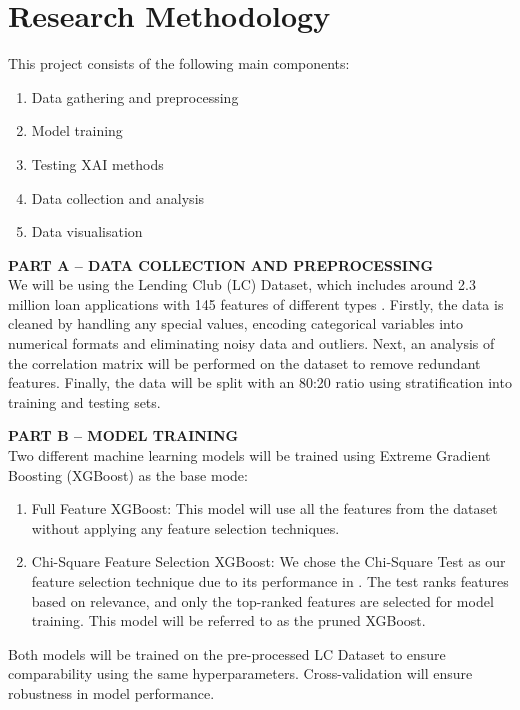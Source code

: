 \documentclass[12pt,a4paper]{article}
\begin{document}
\section{Research Methodology}
\vspace{-1em}
This project consists of the following main components:\\
\vspace{-3em}
\begin{enumerate}[label=\Alph*., itemsep=0.1em]
    \item Data gathering and preprocessing
    \item Model training
    \item Testing XAI methods
    \item Data collection and analysis
    \item Data visualisation
\end{enumerate}
\textbf{PART A – DATA COLLECTION AND PREPROCESSING}\\
We will be using the Lending Club (LC) Dataset, which includes around 2.3 million loan applications with 145 features of different types \citep{demajo2020explainable}. Firstly, the data is cleaned by handling any special values, encoding categorical variables into numerical formats and eliminating noisy data and outliers. Next, an analysis of the correlation matrix will be performed on the dataset to remove redundant features. Finally, the data will be split with an 80:20 ratio using stratification into training and testing sets.

\textbf{PART B – MODEL TRAINING}\\
Two different machine learning models will be trained using Extreme Gradient Boosting (XGBoost) as the base mode:\\
\vspace{-3em}
\begin{enumerate}
    \item Full Feature XGBoost: This model will use all the features from the dataset without applying any feature selection techniques.
    \item Chi-Square Feature Selection XGBoost: We chose the Chi-Square Test as our feature selection technique due to its performance in \citep{TRIVEDI2020101413}. The test ranks features based on relevance, and only the top-ranked features are selected for model training. This model will be referred to as the pruned XGBoost.
\end{enumerate}
\vspace{-1em}
Both models will be trained on the pre-processed LC Dataset to ensure comparability using the same hyperparameters. Cross-validation will ensure robustness in model performance.
\end{document}

